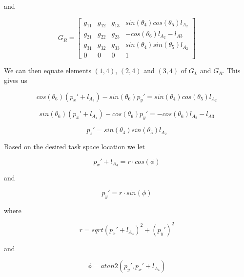and

\begin{equation}
G_R = \left[ \begin{array}{cccc} 
g_{11} & g_{12} & g_{13} & sin(\theta_4)cos(\theta_5)l_{A_2} \\
g_{21} & g_{22} & g_{23} & -cos(\theta_6)l_{A_2}-l_{A3}       \\
g_{31} & g_{32} & g_{33} & sin(\theta_4)sin(\theta_5)l_{A_2}  \\
0      & 0      & 0      & 1   
\end{array} \right]
\end{equation}

We can then equate elements $(1,4)$, $(2,4)$ and $(3,4)$ of $G_L$ and $G_R$. 
This gives us

\begin{equation}\label{eq:thetaSolve11}
cos(\theta_6)(p_x'+l_{A_4})-sin(\theta_6)p_y' = sin(\theta_4)cos(\theta_5)l_{A_2}
\end{equation}

\begin{equation}\label{eq:thetaSolve12}
sin(\theta_6)(p_x'+l_{A_4})-cos(\theta_6)p_y' = -cos(\theta_6)l_{A_2}-l_{A3}
\end{equation}

\begin{equation}\label{eq:thetaSolve13}
p_z' = sin(\theta_4)sin(\theta_5)l_{A_2}
\end{equation}

Based on the desired task space location we let

\begin{equation}\label{eq:thetaSolve21}
p_x' + l_{A_4} = r \cdot cos(\phi)
\end{equation}

and

\begin{equation}\label{eq:thetaSolve22}
p_y' = r \cdot sin(\phi)
\end{equation}

where 

\begin{equation}\label{eq:thetaSolve31}
r = sqrt{(p_x'+l_{A_4})^2 + (p_y')^2}
\end{equation}

and 

\begin{equation}\label{eq:thetaSolve32}
\phi = atan2(p_y',p_x'+l_{A_4})
\end{equation}

